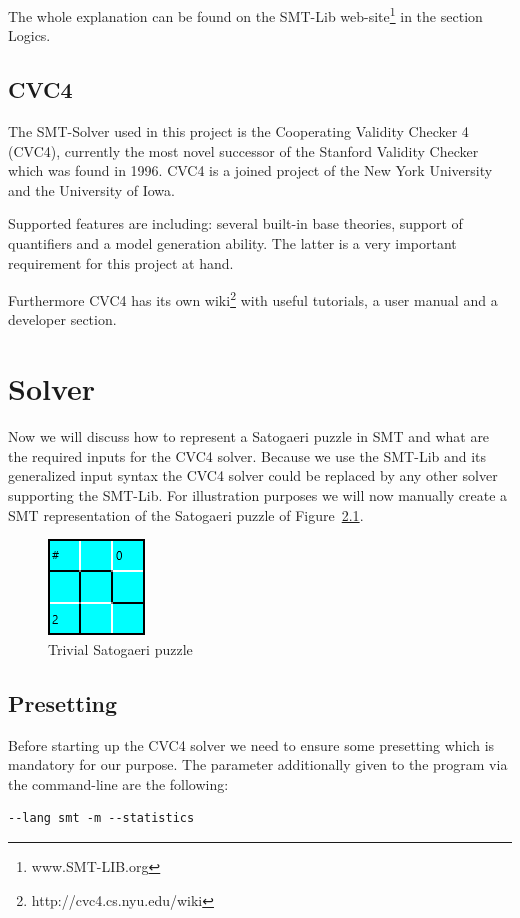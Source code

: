 The whole explanation can be found on the SMT-Lib web-site\footnote{www.SMT-LIB.org} in the section Logics.

\section{CVC4}
The SMT-Solver used in this project is the Cooperating Validity Checker 4 (CVC4), currently the most novel  successor of the Stanford Validity Checker which was found in 1996. CVC4 is a joined project of the New York University and the University of Iowa.

Supported features are including: several built-in base theories, support of quantifiers and a model generation ability. The latter is a very important requirement for this project at hand.

Furthermore CVC4 has its own wiki\footnote{http://cvc4.cs.nyu.edu/wiki} with useful tutorials, a user manual and a developer section.

\chapter{Solver} \label{The Solver}
Now we will discuss how to represent a Satogaeri puzzle in SMT and what are the required inputs for the CVC4 solver. Because we use the SMT-Lib and its generalized input syntax the CVC4 solver could be replaced by any other solver supporting the SMT-Lib. For illustration purposes we will now manually create a SMT representation of the Satogaeri puzzle of Figure~\ref{fig:solver_example}.
\begin{figure}
  \centering
  \includegraphics[scale=1]{Pictures/Solver_example.png} 
  \caption{Trivial Satogaeri puzzle}
  \label{fig:solver_example}
\end{figure}

\section{Presetting}
Before starting up the CVC4 solver we need to ensure some presetting which is mandatory for our purpose.
The parameter additionally given to the program via the command-line are the following:
\begin{lstlisting}
--lang smt -m --statistics
\end{lstlisting}

